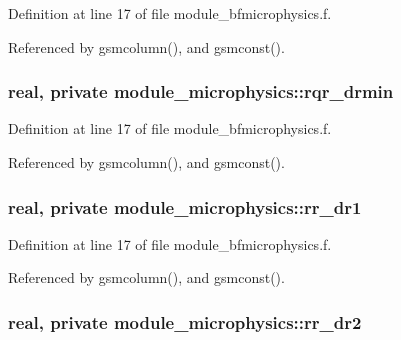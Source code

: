 Definition at line 17 of file module\+\_\+bfmicrophysics.\+f.



Referenced by gsmcolumn(), and gsmconst().

\subsubsection[{\texorpdfstring{rqr\+\_\+drmin}{rqr_drmin}}]{\setlength{\rightskip}{0pt plus 5cm}real, private module\+\_\+microphysics\+::rqr\+\_\+drmin\hspace{0.3cm}{\ttfamily [private]}}\hypertarget{namespacemodule__microphysics_af455571cfd5c41222b9cf86fd014a30f}{}\label{namespacemodule__microphysics_af455571cfd5c41222b9cf86fd014a30f}


Definition at line 17 of file module\+\_\+bfmicrophysics.\+f.



Referenced by gsmcolumn(), and gsmconst().

\subsubsection[{\texorpdfstring{rr\+\_\+dr1}{rr_dr1}}]{\setlength{\rightskip}{0pt plus 5cm}real, private module\+\_\+microphysics\+::rr\+\_\+dr1\hspace{0.3cm}{\ttfamily [private]}}\hypertarget{namespacemodule__microphysics_a31a6bca21f180e2715bbefa18ef32b08}{}\label{namespacemodule__microphysics_a31a6bca21f180e2715bbefa18ef32b08}


Definition at line 17 of file module\+\_\+bfmicrophysics.\+f.



Referenced by gsmcolumn(), and gsmconst().

\subsubsection[{\texorpdfstring{rr\+\_\+dr2}{rr_dr2}}]{\setlength{\rightskip}{0pt plus 5cm}real, private module\+\_\+microphysics\+::rr\+\_\+dr2\hspace{0.3cm}{\ttfamily [private]}}\hypertarget{namespacemodule__microphysics_a47ffe9826a0f85b6bf41c1cf06cf148f}{}\label{namespacemodule__microphysics_a47ffe9826a0f85b6bf41c1cf06cf148f}


